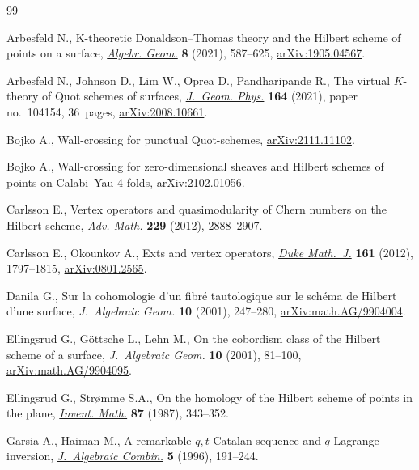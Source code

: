 \begin{thebibliography}{99}
\footnotesize\itemsep=0pt

Arbesfeld N., K-theoretic {D}onaldson--{T}homas theory and the {H}ilbert scheme
 of points on a surface, \href{https://doi.org/10.14231/ag-2021-018}{\textit{Algebr. Geom.}} \textbf{8} (2021), 587--625,
 \href{https://arxiv.org/abs/1905.04567}{arXiv:1905.04567}.

Arbesfeld N., Johnson D., Lim W., Oprea D., Pandharipande R., The virtual
 {$K$}-theory of {Q}uot schemes of surfaces, \href{https://doi.org/10.1016/j.geomphys.2021.104154}{\textit{J.~Geom. Phys.}}
 \textbf{164} (2021), paper no.~104154, 36~pages, \href{https://arxiv.org/abs/2008.10661}{arXiv:2008.10661}.

Bojko A., Wall-crossing for punctual {Q}uot-schemes, \href{https://arxiv.org/abs/2111.11102}{arXiv:2111.11102}.

Bojko A., Wall-crossing for zero-dimensional sheaves and {H}ilbert schemes of
 points on {C}alabi--{Y}au 4-folds, \href{https://arxiv.org/abs/2102.01056}{arXiv:2102.01056}.

Carlsson E., Vertex operators and quasimodularity of {C}hern numbers on the
 {H}ilbert scheme, \href{https://doi.org/10.1016/j.aim.2011.10.003}{\textit{Adv. Math.}} \textbf{229} (2012), 2888--2907.

Carlsson E., Okounkov A., Exts and vertex operators, \href{https://doi.org/10.1215/00127094-1593380}{\textit{Duke Math.~J.}}
 \textbf{161} (2012), 1797--1815, \href{https://arxiv.org/abs/0801.2565}{arXiv:0801.2565}.

Danila G., Sur la cohomologie d'un fibr\'e tautologique sur le sch\'ema de
 {H}ilbert d'une surface, \textit{J.~Algebraic Geom.} \textbf{10} (2001),
 247--280, \href{https://arxiv.org/abs/math.AG/9904004}{arXiv:math.AG/9904004}.

Ellingsrud G., G\"ottsche L., Lehn M., On the cobordism class of the {H}ilbert
 scheme of a surface, \textit{J.~Algebraic Geom.} \textbf{10} (2001), 81--100,
 \href{https://arxiv.org/abs/math.AG/9904095}{arXiv:math.AG/9904095}.

Ellingsrud G., Str{\o}mme S.A., On the homology of the {H}ilbert scheme of
 points in the plane, \href{https://doi.org/10.1007/BF01389419}{\textit{Invent. Math.}} \textbf{87} (1987), 343--352.

Garsia A., Haiman M., A remarkable {$q,t$}-Catalan sequence and {$q$}-Lagrange
 inversion, \href{https://doi.org/10.1023/A:1022476211638}{\textit{J.~Algebraic Combin.}} \textbf{5} (1996), 191--244.


\end{thebibliography}
